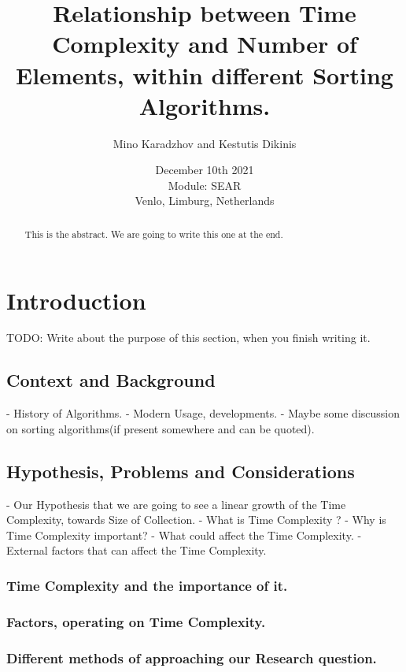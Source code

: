 \documentclass[]{report}
\title{Relationship between Time Complexity and Number of Elements, within different Sorting Algorithms.}
\author{Mino Karadzhov and Kestutis Dikinis}
\date{December 10th 2021 \\Module: SEAR \\Venlo, Limburg, Netherlands}
\begin{document}
\maketitle

\begin{abstract}
This is the abstract. We are going to write this one at the end.


\end{abstract}

\tableofcontents
\setcounter{page}{3}
\listoffigures %
\pagebreak

	
\section{Introduction}
TODO: Write about the purpose of this section, when you finish writing it.
  
\subsection{Context and Background}
		- History of Algorithms.
		- Modern Usage, developments.
		- Maybe some discussion on sorting algorithms(if present somewhere and can be quoted).
\subsection{Hypothesis, Problems and Considerations}
		- Our Hypothesis that we are going to see a linear growth of the Time Complexity, towards Size of Collection.
		- What is Time Complexity ?
		- Why is Time Complexity important? 
		-  What could affect the Time Complexity.
		- External factors that can affect the Time Complexity.
		\subsubsection{Time Complexity and the importance of it.}
		\subsubsection{Factors, operating on Time Complexity.}
		\subsubsection{Different methods of approaching our Research question.}
		
\end{document}
